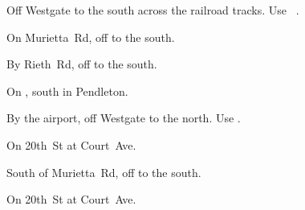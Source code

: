 
\begin{LocationList}

Off  Westgate to the south across the railroad tracks.
Use~ .

On Murietta~Rd, off   to the south.

By Rieth~Rd, off   to the south.

\Location{\GasStation \Gas}
On , south in Pendleton.

By the airport, off  Westgate to the north. Use  .

On 20th~St at Court~Ave.

South of Murietta~Rd, off   to the south.

On 20th~St at Court~Ave.

\end{LocationList}
